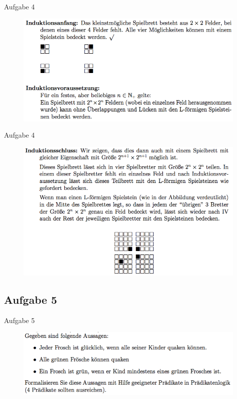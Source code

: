 \begin{frame}{Aufgabe 4}
\begin{figure}[h!]
		\centering
		\includegraphics[width=\textwidth]{9.png} 
	\end{figure}    
\end{frame}

\begin{frame}{Aufgabe 4}
\begin{figure}[h!]
		\centering
		\includegraphics[width=\textwidth]{10.png} 
	\end{figure}    
\end{frame}

\subsection{Aufgabe 5}
\begin{frame}{Aufgabe 5}
\begin{figure}[h!]
		\centering
		\includegraphics[width=\textwidth]{11.png} 
	\end{figure}     
\end{frame}

